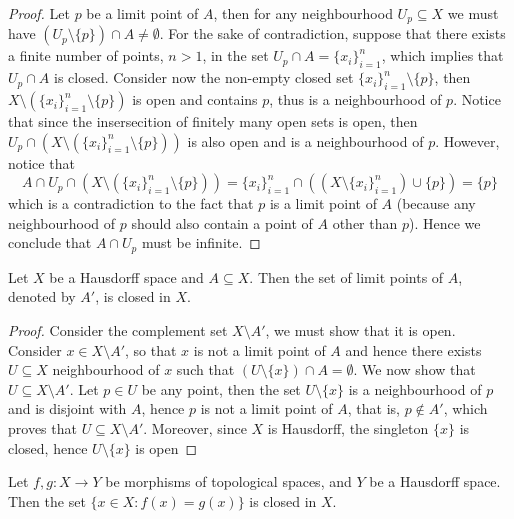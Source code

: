 \begin{proof}
Let \(p\) be a limit point of \(A\), then for any neighbourhood \(U_p
\subseteq X\) we must have \((U_p \setminus \{p\}) \cap A \neq \emptyset\).
For the sake of contradiction, suppose that there exists a finite number of
points, \(n > 1\), in the set \(U_p \cap A = \{x_i\}_{i=1}^n\), which implies
that \(U_p \cap A\) is closed. Consider now the non-empty closed set
\(\{x_i\}_{i=1}^n \setminus \{p\}\), then \(X \setminus (\{x_i\}_{i=1}^n
\setminus \{p\})\) is open and contains \(p\), thus is a neighbourhood of
\(p\). Notice that since the insersecition of finitely many open sets is open,
then \(U_p \cap \left( X \setminus \left( \{x_i\}_{i=1}^n \setminus \{p\}
\right) \right)\) is also open and is a neighbourhood of \(p\). However, notice
that
\[
  A \cap U_p \cap (X \setminus (\{x_i\}_{i=1}^n \setminus \{p\}))
  = \{x_i\}_{i=1}^n \cap ((X \setminus \{x_i\}_{i=1}^n) \cup \{p\})
  = \{p\}
\]
which is a contradiction to the fact that \(p\) is a limit point of \(A\)
(because any neighbourhood of \(p\) should also contain a point of \(A\) other
than \(p\)). Hence we conclude that \(A \cap U_p\) must be infinite.
\end{proof}

\begin{proposition}
Let \(X\) be a Hausdorff space and \(A \subseteq X\). Then the set of limit
points of \(A\), denoted by \(A'\), is closed in \(X\).
\end{proposition}

\begin{proof}
Consider the complement set \(X \setminus A'\), we must show that it is open.
Consider \(x \in X \setminus A'\), so that \(x\) is not a limit point of \(A\)
and hence there exists \(U \subseteq X\) neighbourhood of \(x\) such that \((U
\setminus \{x\}) \cap A = \emptyset\). We now show that \(U \subseteq X
\setminus A'\). Let \(p \in U\) be any point, then the set \(U \setminus
\{x\}\) is a neighbourhood of \(p\) and is disjoint with \(A\), hence \(p\) is
not a limit point of \(A\), that is, \(p \not\in A'\), which proves that \(U
\subseteq X \setminus A'\). Moreover, since \(X\) is Hausdorff, the singleton
\(\{x\}\) is closed, hence \(U \setminus \{x\}\) is open
\end{proof}

\begin{proposition}
Let \(f,g : X \to Y\) be morphisms of topological spaces, and \(Y\) be a
Hausdorff space. Then the set \(\{x \in X \colon f(x) = g(x)\}\) is closed in
\(X\).
\end{proposition}

